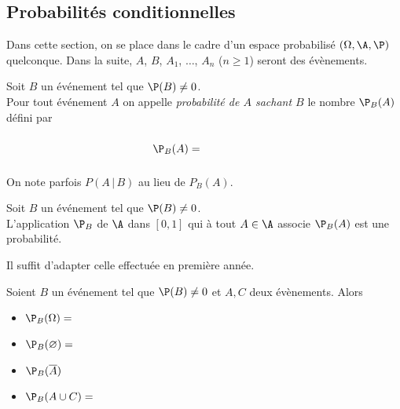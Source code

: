 \documentclass[a4paper,10pt]{report}
\begin{document}
\begin{enumerate}
\section{Probabilités conditionnelles}
Dans cette section, on se place dans le cadre d'un espace probabilisé $(\Omega, \A, \P)$ quelconque. Dans la suite, $A$, $B$, $A_1$, $\ldots$, $A_n$ ($n \geq 1$) seront des évènements.

\begin{Definition}{}
Soit $B$ un événement tel que $\P(B) \neq 0$.\\
Pour tout événement $A$ on appelle \emph{probabilité de $A$ sachant $B$} le nombre $\P_B(A)$ défini par 

$$ \P_B(A) = \phantom{\frac{\P(A\cap B)}{\P(B)}}$$

\end{Definition}

\begin{Remarque}{} On note parfois $P(A \, \vert \, B)$ au lieu de $P_B(A)$.
\end{Remarque}


\begin{Proposition}{}
Soit $B$ un événement tel que $\P(B) \neq 0$.\\
L'application $\P_B$ de $\A$ dans $[0,1]$ qui à tout $A \in \A$ associe $\P_B(A)$ est une probabilité.
\end{Proposition}

\begin{Demonstration}{}
Il suffit d'adapter celle effectuée en première année.
\end{Demonstration}
\begin{Corollaire}{}
Soient $B$ un événement tel que $\P(B) \ne 0$ et $A,C$ deux évènements. Alors 
 \begin{itemize}
  \item $\P_B(\Omega) = $
  \item $\P_B(\varnothing) = $
  \item $\P_B(\overline{A})$
  \item $\P_B(A\cup C) = $
 \end{itemize}
\end{Corollaire}
%



\end{enumerate}
\end{document}
